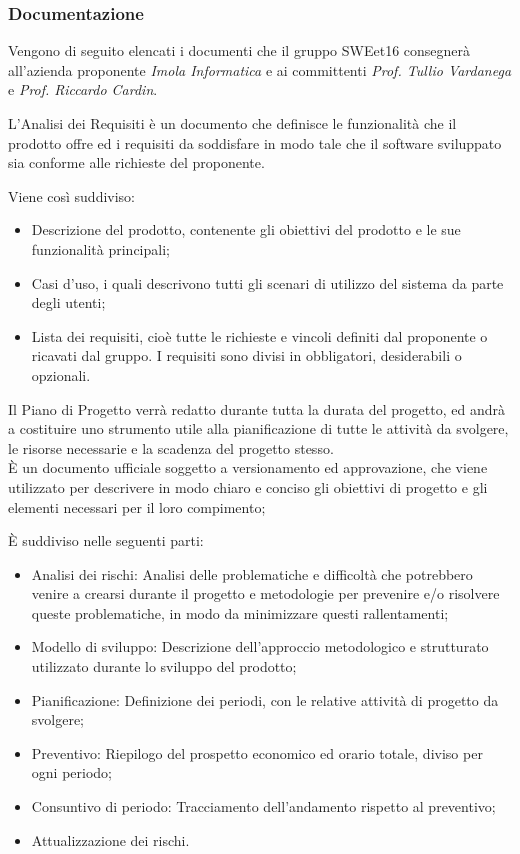 \subsubsection{Documentazione}

Vengono di seguito elencati i documenti che il gruppo SWEet16 consegnerà all'azienda proponente \textit{Imola Informatica} e ai committenti \textit{Prof. Tullio Vardanega} e \textit{Prof. Riccardo Cardin}.



    L'Analisi dei Requisiti è un documento che definisce le funzionalità che il prodotto offre ed i requisiti da soddisfare in modo tale che il software sviluppato sia conforme alle richieste del proponente.

    Viene così suddiviso:
    \begin{itemize}
        \item Descrizione del prodotto, contenente gli obiettivi del prodotto e le sue funzionalità principali;
        \item Casi d'uso, i quali descrivono tutti gli scenari di utilizzo del sistema da parte degli utenti;
        \item Lista dei requisiti, cioè tutte le richieste e vincoli definiti dal proponente o ricavati dal gruppo. I requisiti sono divisi in obbligatori, desiderabili o opzionali.
    \end{itemize}




    Il Piano di Progetto verrà redatto durante tutta la durata del progetto, ed andrà a costituire uno strumento utile alla pianificazione di tutte le attività da svolgere, le risorse necessarie e la scadenza del progetto stesso. \\
    È un documento ufficiale soggetto a versionamento ed approvazione, che viene utilizzato per descrivere in modo chiaro e conciso gli obiettivi di progetto e gli elementi necessari per il loro compimento;

    È suddiviso nelle seguenti parti:
    \begin{itemize}
        \item Analisi dei rischi: Analisi delle problematiche e difficoltà che potrebbero venire a crearsi durante il progetto e metodologie per prevenire e/o risolvere queste problematiche, in modo da minimizzare questi rallentamenti;
        \item Modello di sviluppo: Descrizione dell'approccio metodologico e strutturato utilizzato durante lo sviluppo del prodotto;
        \item Pianificazione: Definizione dei periodi, con le relative attività di progetto da svolgere;
        \item Preventivo: Riepilogo del prospetto economico ed orario totale, diviso per ogni periodo;
        \item Consuntivo di periodo: Tracciamento dell’andamento rispetto al preventivo;
        \item Attualizzazione dei rischi.
    \end{itemize}


